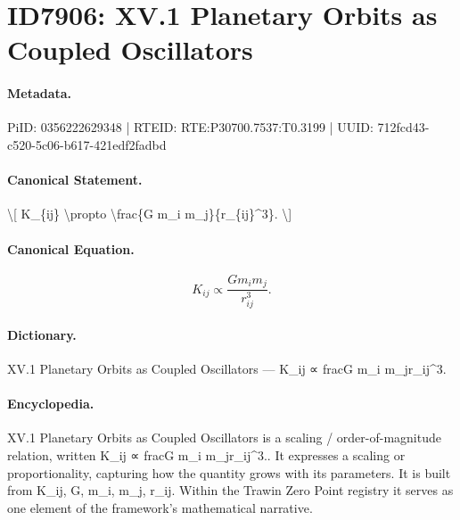 \section*{ID7906: XV.1 Planetary Orbits as Coupled Oscillators}
\paragraph{Metadata.}
PiID: 0356222629348 | RTEID: RTE:P30700.7537:T0.3199 | UUID: 712fcd43-c520-5c06-b617-421edf2fadbd

\paragraph{Canonical Statement.}
\textbackslash{}[ K\_\{ij\} \textbackslash{}propto \textbackslash{}frac\{G m\_i m\_j\}\{r\_\{ij\}\textasciicircum{}3\}. \textbackslash{}]

\paragraph{Canonical Equation.}
\[
K_{ij} \propto \frac{G m_i m_j}{r_{ij}^3}.
\]

\paragraph{Dictionary.}
XV.1 Planetary Orbits as Coupled Oscillators — K\_ij ∝ fracG m\_i m\_jr\_ij\textasciicircum{}3.

\paragraph{Encyclopedia.}
XV.1 Planetary Orbits as Coupled Oscillators is a scaling / order-of-magnitude relation, written K\_ij ∝ fracG m\_i m\_jr\_ij\textasciicircum{}3.. It expresses a scaling or proportionality, capturing how the quantity grows with its parameters. It is built from K\_ij, G, m\_i, m\_j, r\_ij. Within the Trawin Zero Point registry it serves as one element of the framework's mathematical narrative.
